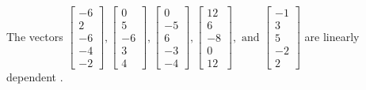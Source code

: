 \begin{exercise}
\begin{exerciseStatement}
  \end{exerciseStatement}
  \begin{exerciseAnswer}
   The vectors \(\left[\begin{array}{r}
-6 \\
2 \\
-6 \\
-4 \\
-2
\end{array}\right] , \left[\begin{array}{r}
0 \\
5 \\
-6 \\
3 \\
4
\end{array}\right] , \left[\begin{array}{r}
0 \\
-5 \\
6 \\
-3 \\
-4
\end{array}\right] , \left[\begin{array}{r}
12 \\
6 \\
-8 \\
0 \\
12
\end{array}\right] , \text{ and } \left[\begin{array}{r}
-1 \\
3 \\
5 \\
-2 \\
2
\end{array}\right]\) are 
  	 linearly dependent  .
  


  \end{exerciseAnswer}
\end{exercise}